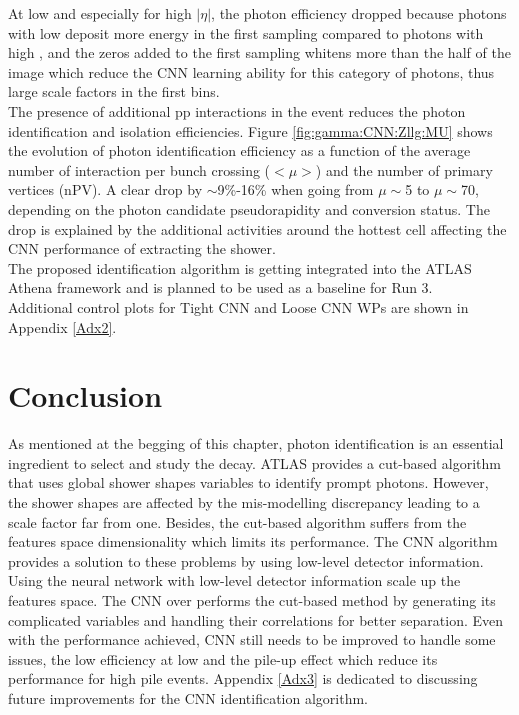 At low \eT and especially for high $|\eta|$, the photon efficiency dropped because photons with low \eT deposit more energy in the first sampling compared to photons with high \eT, and the zeros added to the first sampling whitens more than the half of the image which reduce the CNN learning ability for this category of photons, thus large scale factors in the first \eT bins. \\
The presence of additional pp interactions in the event reduces the photon identification and isolation efficiencies. Figure \ref{fig:gamma:CNN:Zllg:MU} shows the evolution of photon identification efficiency as a function of the average number of interaction per bunch crossing ($<\mu>$) and the number of primary vertices (nPV). A clear drop by $\sim$9\%-16\% when going from $\mu\sim$5 to $\mu\sim$70, depending on the photon candidate pseudorapidity and conversion status. The drop is explained by the additional activities around the hottest cell affecting the CNN performance of extracting the shower. \\
The proposed identification algorithm is getting integrated into the ATLAS Athena framework and is planned to be used as a baseline for Run 3. \\
Additional control plots for Tight CNN and Loose CNN WPs are shown in Appendix \ref{Adx2}.

\section{Conclusion}
\label{gamma:conc}

As mentioned at the begging of this chapter, photon identification is an essential ingredient to select and study the \HHyybb decay. ATLAS provides a cut-based algorithm that uses global shower shapes variables to identify prompt photons. However, the shower shapes are affected by the mis-modelling discrepancy leading to a scale factor far from one. Besides, the cut-based algorithm suffers from the features space dimensionality which limits its performance. The CNN algorithm provides a solution to these problems by using low-level detector information. Using the neural network with low-level detector information scale up the features space. The CNN over performs the cut-based method by generating its complicated variables and handling their correlations for better separation. Even with the performance achieved, CNN still needs to be improved to handle some issues, the low efficiency at low \eT and the pile-up effect which reduce its performance for high pile events. Appendix \ref{Adx3} is dedicated to discussing future improvements for the CNN identification algorithm. 
